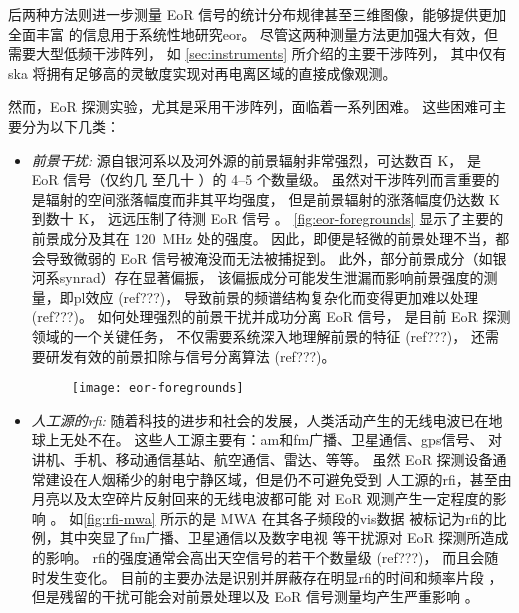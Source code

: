 后两种方法则进一步测量 EoR 信号的统计分布规律甚至三维图像，能够提供更加全面丰富
的信息用于系统性地研究\acl{eor}。
尽管这两种测量方法更加强大有效，但需要大型低频干涉阵列，
如 \autoref{sec:instruments} 所介绍的主要干涉阵列，
其中仅有 \acs{ska} 将拥有足够高的灵敏度实现对再电离区域的直接成像观测。

然而，EoR 探测实验，尤其是采用干涉阵列，面临着一系列困难。
这些困难可主要分为以下几类：
\begin{itemize}
\item
\emph{前景干扰:}
源自银河系以及河外源的前景辐射非常强烈，可达数百 \si{\kelvin}，
是 EoR 信号（仅约几 \si{\mK} 至几十 \si{\mK}）的 \numrange{4}{5} 个数量级。
虽然对干涉阵列而言重要的是辐射的空间涨落幅度而非其平均强度，
但是前景辐射的涨落幅度仍达数 \si{\kelvin} 到数十 \si{\kelvin}，
远远压制了待测 EoR 信号 \cite{zaroubi2013}。
\autoref{fig:eor-foregrounds} 显示了主要的前景成分及其在
\SI{120}{\MHz} 处的强度。
因此，即便是轻微的前景处理不当，都会导致微弱的 EoR 信号被淹没而无法被捕捉到。
此外，部分前景成分（如银河系\acl{synrad}）存在显著偏振，
该偏振成分可能发生泄漏而影响前景强度的测量，即\ac{pl}效应 (ref???)，
导致前景的频谱结构复杂化而变得更加难以处理 (ref???)。
如何处理强烈的前景干扰并成功分离 EoR 信号，
是目前 EoR 探测领域的一个关键任务，
不仅需要系统深入地理解前景的特征 \cite{offringa2016,carroll2016,procopio2017} (ref???)，
还需要研发有效的前景扣除与信号分离算法 \cite{chapman2015,chapman2016} (ref???)。

\begin{figure}[tbp]
  \centering
  \texttt{[image: eor-foregrounds]}
  \label{fig:eor-foregrounds}
\end{figure}

\item
\emph{人工源的\acl{rfi}:}
随着科技的进步和社会的发展，人类活动产生的无线电波已在地球上无处不在。
这些人工源主要有：\ac{am}和\ac{fm}广播、卫星通信、\ac{gps}信号、
对讲机、手机、移动通信基站、航空通信、雷达、等等。
虽然 EoR 探测设备通常建设在人烟稀少的射电宁静区域，但是仍不可避免受到
人工源的\acl{rfi}，甚至由月亮以及太空碎片反射回来的无线电波都可能
对 EoR 观测产生一定程度的影响 \cite{mckinley2013,tingay2013rfi}。
如\autoref{fig:rfi-mwa} 所示的是 MWA 在其各子频段的\acl{vis}数据
被标记为\acl{rfi}的比例，其中突显了\ac{fm}广播、卫星通信以及数字电视
等干扰源对 EoR 探测所造成的影响。
\acl{rfi}的强度通常会高出天空信号的若干个数量级 \cite{bentum2011} (ref???)，
而且会随时发生变化。
目前的主要办法是识别并屏蔽存在明显\acl{rfi}的时间和频率片段
\cite{offringa2010,offringa2012,prasad2012}，
但是残留的干扰可能会对前景处理以及 EoR 信号测量均产生严重影响 \cite{offringa2015}。


\end{itemize}
